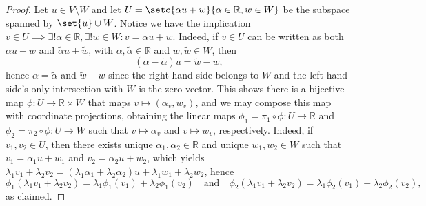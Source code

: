 \begin{proof}
    Let \(u \in V \setminus W\) and let \(U = \setc{\alpha u + w}{\alpha \in \mathbb{R}, w \in W}\) be the subspace spanned by \(\set{u} \cup W\). Notice we have the implication \(v \in U \implies \exists! \alpha \in \mathbb{R}, \exists! w \in W : v = \alpha u + w\). Indeed, if \(v \in U\) can be written as both \(\alpha u + w\) and \(\tilde{\alpha}u + \tilde{w}\), with \(\alpha, \tilde{\alpha}\in \mathbb{R}\) and \(w, \tilde{w} \in W\), then
    \begin{equation*}
        (\alpha - \tilde{\alpha})u = \tilde{w} - w,
    \end{equation*}
    hence \(\alpha = \tilde{\alpha}\) and \(\tilde{w} - w\) since the right hand side belongs to \(W\) and the left hand side's only intersection with \(W\) is the zero vector. This shows there is a bijective map \(\phi : U \to \mathbb{R} \times W\) that maps \(v \mapsto (\alpha_v, w_v)\), and we may compose this map with coordinate projections, obtaining the linear maps \(\phi_1 = \pi_1 \circ \phi : U \to \mathbb{R}\) and \(\phi_2 = \pi_2 \circ \phi : U \to W\) such that \(v \mapsto \alpha_v\) and \(v \mapsto w_v\), respectively. Indeed, if \(v_1, v_2 \in U\), then there exists unique \(\alpha_1, \alpha_2 \in \mathbb{R}\) and unique \(w_1, w_2 \in W\) such that \(v_1 = \alpha_1 u + w_1\) and \(v_2 = \alpha_2 u + w_2\), which yields \(\lambda_1 v_1 + \lambda_2 v_2 = \left(\lambda_1 \alpha_1 + \lambda_2 \alpha_2\right) u + \lambda_1 w_1 + \lambda_2 w_2\), hence
    \begin{equation*}
        \phi_1(\lambda_1 v_1 + \lambda_2 v_2) = \lambda_1 \phi_1(v_1) + \lambda_2 \phi_1(v_2)
        \quad\text{and}\quad
        \phi_2(\lambda_1 v_1 + \lambda_2 v_2) = \lambda_1 \phi_2(v_1) + \lambda_2 \phi_2(v_2),
    \end{equation*}
    as claimed.


\end{proof}
